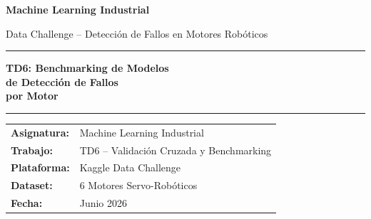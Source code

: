\documentclass[12pt,a4paper]{article}
\begin{document}

\begin{titlepage}
\centering
\vspace*{1.5cm}

{\Large\bfseries Machine Learning Industrial\par}
\vspace{0.3cm}
{\large Data Challenge -- Detecci\'{o}n de Fallos en Motores Rob\'{o}ticos\par}

\vspace{1.2cm}
\hrule height 2pt
\vspace{0.5cm}

{\Huge\bfseries\color{titlebg}
TD6: Benchmarking de Modelos\\[0.3em]
de Detecci\'{o}n de Fallos\\[0.3em]
por Motor
\par}

\vspace{0.5cm}
\hrule height 2pt
\vspace{1.5cm}

\begin{center}
\begin{tabular}{ll}
\textbf{Asignatura:} & Machine Learning Industrial \\[4pt]
\textbf{Trabajo:}    & TD6 -- Validaci\'{o}n Cruzada y Benchmarking \\[4pt]
\textbf{Plataforma:} & Kaggle Data Challenge \\[4pt]
\textbf{Dataset:}    & 6 Motores Servo-Rob\'{o}ticos \\[4pt]
\textbf{Fecha:}      & Junio 2026 \\
\end{tabular}
\end{center}

\vspace{1.5cm}

\begin{abstract}
\noindent
Este documento presenta el benchmarking completo de cuatro modelos de machine learning
para la detecci\'{o}n de fallos individuales en seis motores servo-rob\'{o}ticos, en el marco de
un Data Challenge de Kaggle. Se aplica validaci\'{o}n cruzada de 5 pliegues con b\'{u}squeda
anidada de hiperpar\'{a}metros para comparar AAKR (\textit{Auto-Associative Kernel Regression}),
Random Forest, Gradient Boosting e Histogramado y Regresi\'{o}n Log\'{i}stica, evaluando
precisi\'{o}n, recall y F1-score. Cada decisi\'{o}n t\'{e}cnica --desde el preprocesamiento hasta
la arquitectura de evaluaci\'{o}n-- se analiza en profundidad explicando el \textit{por qu\'{e}}
de cada elecci\'{o}n. Se selecciona el mejor modelo por motor, se entrena sobre el conjunto
completo de entrenamiento y se genera una \textit{submission} para Kaggle. El an\'{a}lisis
revela que Random Forest con pesos balanceados domina gracias a su robustez al desbalanceo
extremo de clases (hasta 200:1), y explica mediante an\'{a}lisis estad\'{i}stico la raz\'{o}n
por la que la alta varianza entre pliegues es un fen\'{o}meno esperado y no un defecto
del dise\~{n}o experimental.
\end{abstract}


\end{titlepage}
\end{document}
